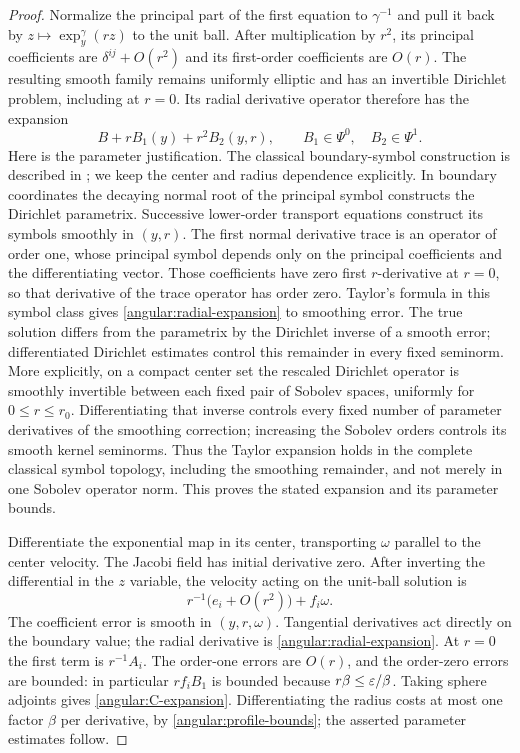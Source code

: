 \begin{proof}
Normalize the principal part of the first equation to $\gamma^{-1}$ and
pull it back by $z\mapsto\exp_y^\gamma(rz)$ to the unit ball.  After
multiplication by $r^2$, its principal coefficients are
$\delta^{ij}+O(r^2)$ and its first-order coefficients are $O(r)$.
The resulting smooth family remains uniformly elliptic and has an
invertible Dirichlet problem, including at $r=0$.  Its radial derivative
operator therefore has the expansion
\begin{equation}\label{angular:radial-expansion}
 B+r B_1(y)+r^2 B_2(y,r),\qquad
 B_1\in\Psi^0,\quad B_2\in\Psi^1.
\end{equation}
Here is the parameter justification.  The classical boundary-symbol
construction is described in
\citep[Theorem~1.1(i) and Proposition~3.1]{JoshiLionheart2005};
we keep the center and radius dependence explicitly.
In boundary coordinates the decaying
normal root of the principal symbol constructs the Dirichlet parametrix.
Successive lower-order transport equations construct its symbols smoothly
in $(y,r)$.  The first normal derivative trace is an operator of order one,
whose principal symbol depends only on the principal coefficients and the
differentiating vector.  Those coefficients have zero first $r$-derivative
at $r=0$, so that derivative of the trace operator has order zero.  Taylor's
formula in this symbol class gives \eqref{angular:radial-expansion} to
smoothing error.  The true solution differs from the parametrix by the
Dirichlet inverse of a smooth error; differentiated Dirichlet estimates
control this remainder in every fixed seminorm.  More explicitly, on a
compact center set the rescaled Dirichlet operator is smoothly
invertible between each fixed pair of Sobolev spaces, uniformly for
$0\le r\le r_0$.  Differentiating that inverse controls every fixed
number of parameter derivatives of the smoothing correction; increasing
the Sobolev orders controls its smooth kernel seminorms.  Thus the
Taylor expansion holds in the complete classical symbol topology,
including the smoothing remainder, and not merely in one Sobolev
operator norm.  This proves the stated expansion and its parameter bounds.

Differentiate the exponential map in its center, transporting $\omega$
parallel to the center velocity.  The Jacobi field has initial derivative
zero.  After inverting the differential in the $z$ variable, the velocity
acting on the unit-ball solution is
\[
 r^{-1}\bigl(e_i+O(r^2)\bigr)+f_i\omega.
\]
The coefficient error is smooth in $(y,r,\omega)$.  Tangential derivatives
act directly on the boundary value; the radial derivative is
\eqref{angular:radial-expansion}.  At $r=0$ the first term is $r^{-1}A_i$.
The order-one errors are $O(r)$, and the order-zero errors are bounded:
in particular $r f_i B_1$ is bounded because $r\beta\le\varepsilon/\beta$.
Taking sphere adjoints gives \eqref{angular:C-expansion}.  Differentiating
the radius costs at most one factor $\beta$ per derivative, by
\eqref{angular:profile-bounds}; the asserted parameter estimates follow.


\end{proof}
